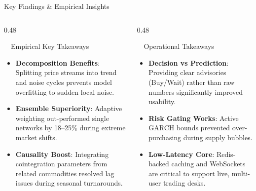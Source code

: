 \documentclass{beamer}
\begin{document}
\begin{frame}{Key Findings \& Empirical Insights}
\vspace{-0.2cm}

\begin{columns}[T]
    \begin{column}{0.48\textwidth}
        \begin{successcard}[height=5.2cm]{~~Empirical Key Takeaways}
            \fontsize{6.8pt}{8.5pt}\selectfont
            \begin{itemize}\setlength\itemsep{4.5pt}\setlength\parskip{0pt}
                \item \textbf{Decomposition Benefits}: Splitting price streams into trend and noise cycles prevents model overfitting to sudden local noise.
                \item \textbf{Ensemble Superiority}: Adaptive weighting out-performed single networks by 18--25\% during extreme market shifts.
                \item \textbf{Causality Boost}: Integrating cointegration parameters from related commodities resolved lag issues during seasonal turnarounds.
            \end{itemize}
        \end{successcard}
    \end{column}
    
    \begin{column}{0.48\textwidth}
        \begin{infocard}[height=5.2cm]{~~Operational Takeaways}
            \fontsize{6.8pt}{8.5pt}\selectfont
            \begin{itemize}\setlength\itemsep{4.5pt}\setlength\parskip{0pt}
                \item \textbf{Decision vs Prediction}: Providing clear advisories (Buy/Wait) rather than raw numbers significantly improved usability.
                \item \textbf{Risk Gating Works}: Active GARCH bounds prevented over-purchasing during supply bubbles.
                \item \textbf{Low-Latency Core}: Redis-backed caching and WebSockets are critical to support live, multi-user trading desks.
            \end{itemize}
        \end{infocard}
    \end{column}
\end{columns}


\end{frame}
\end{document}
